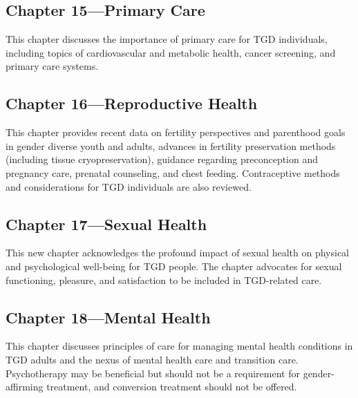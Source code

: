 \documentclass[
]{book}
\begin{document}
\hypertarget{chapter-15primary-care}{%
\subsection*{Chapter 15---Primary Care}\label{chapter-15primary-care}}

This chapter discusses the importance of primary
care for TGD individuals, including topics of cardiovascular and metabolic health, cancer screening, and primary care systems.

\hypertarget{chapter-16reproductive-health}{%
\subsection*{Chapter 16---Reproductive Health}\label{chapter-16reproductive-health}}

This chapter provides recent data on fertility perspectives and parenthood goals in gender diverse
youth and adults, advances in fertility preservation methods (including tissue cryopreservation),
guidance regarding preconception and pregnancy
care, prenatal counseling, and chest feeding.
Contraceptive methods and considerations for
TGD individuals are also reviewed.

\hypertarget{chapter-17sexual-health}{%
\subsection*{Chapter 17---Sexual Health}\label{chapter-17sexual-health}}

This new chapter acknowledges the profound
impact of sexual health on physical and psychological well-being for TGD people. The chapter
advocates for sexual functioning, pleasure, and
satisfaction to be included in TGD-related care.

\hypertarget{chapter-18mental-health}{%
\subsection*{Chapter 18---Mental Health}\label{chapter-18mental-health}}

This chapter discusses principles of care for managing mental health conditions in TGD adults
and the nexus of mental health care and transition care. Psychotherapy may be beneficial but
should not be a requirement for gender-affirming
treatment, and conversion treatment should not
be offered.
\end{document}
